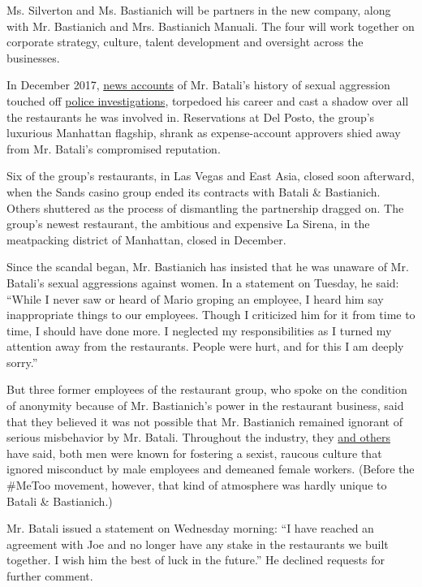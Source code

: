 Ms. Silverton and Ms. Bastianich will be partners in the new company,
along with Mr. Bastianich and Mrs. Bastianich Manuali. The four will
work together on corporate strategy, culture, talent development and
oversight across the businesses.

In December 2017,
\href{https://www.nytimes.com/2017/12/11/dining/mario-batali-sexual-misconduct.html}{news
accounts} of Mr. Batali's history of sexual aggression touched off
\href{https://www.nytimes.com/2018/05/21/dining/mario-batali-sexual-assault.html}{police
investigations}, torpedoed his career and cast a shadow over all the
restaurants he was involved in. Reservations at Del Posto, the group's
luxurious Manhattan flagship, shrank as expense-account approvers shied
away from Mr. Batali's compromised reputation.

Six of the group's restaurants, in Las Vegas and East Asia, closed soon
afterward, when the Sands casino group ended its contracts with Batali
\& Bastianich. Others shuttered as the process of dismantling the
partnership dragged on. The group's newest restaurant, the ambitious and
expensive La Sirena, in the meatpacking district of Manhattan, closed in
December.

Since the scandal began, Mr. Bastianich has insisted that he was unaware
of Mr. Batali's sexual aggressions against women. In a statement on
Tuesday, he said: ``While I never saw or heard of Mario groping an
employee, I heard him say inappropriate things to our employees. Though
I criticized him for it from time to time, I should have done more. I
neglected my responsibilities as I turned my attention away from the
restaurants. People were hurt, and for this I am deeply sorry.''

But three former employees of the restaurant group, who spoke on the
condition of anonymity because of Mr. Bastianich's power in the
restaurant business, said that they believed it was not possible that
Mr. Bastianich remained ignorant of serious misbehavior by Mr. Batali.
Throughout the industry, they
\href{https://ny.eater.com/2017/12/22/16809430/batali-bastianich-misconduct-restaurant-culture}{and
others} have said, both men were known for fostering a sexist, raucous
culture that ignored misconduct by male employees and demeaned female
workers. (Before the \#MeToo movement, however, that kind of atmosphere
was hardly unique to Batali \& Bastianich.)

Mr. Batali issued a statement on Wednesday morning: ``I have reached an
agreement with Joe and no longer have any stake in the restaurants we
built together. I wish him the best of luck in the future.'' He declined
requests for further comment.

